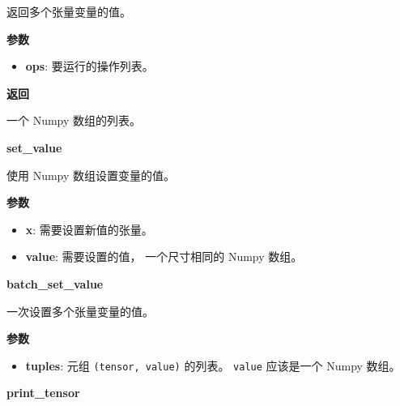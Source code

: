 \begin{Shaded}
\begin{Highlighting}[]
\end{Highlighting}
\end{Shaded}

返回多个张量变量的值。

\textbf{参数}

\begin{itemize}
\tightlist
\item
  \textbf{ops}: 要运行的操作列表。
\end{itemize}

\textbf{返回}

一个 Numpy 数组的列表。


\textbf{set\_value}\label{setux5fvalue}

\begin{Shaded}
\begin{Highlighting}[]
\end{Highlighting}
\end{Shaded}

使用 Numpy 数组设置变量的值。

\textbf{参数}

\begin{itemize}
\tightlist
\item
  \textbf{x}: 需要设置新值的张量。
\item
  \textbf{value}: 需要设置的值， 一个尺寸相同的 Numpy 数组。
\end{itemize}


\textbf{batch\_set\_value}\label{batchux5fsetux5fvalue}

\begin{Shaded}
\begin{Highlighting}[]
\end{Highlighting}
\end{Shaded}

一次设置多个张量变量的值。

\textbf{参数}

\begin{itemize}
\tightlist
\item
  \textbf{tuples}: 元组 \texttt{(tensor,\ value)} 的列表。
  \texttt{value} 应该是一个 Numpy 数组。
\end{itemize}


\textbf{print\_tensor}\label{printux5ftensor}

